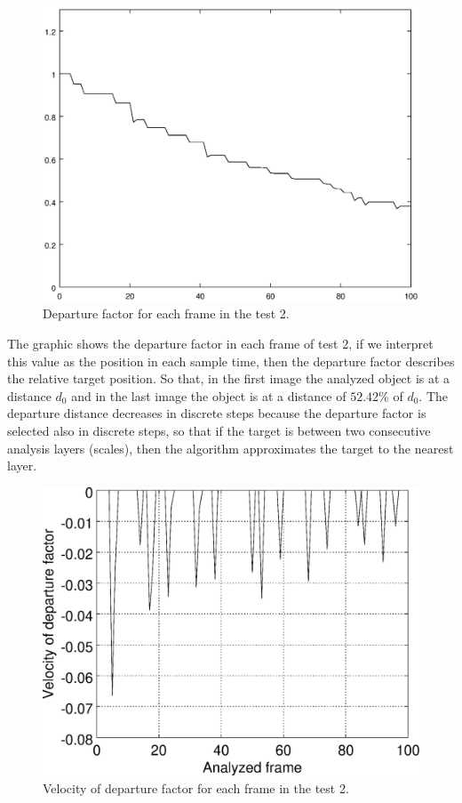 \begin{figure}[!hbt]
\includegraphics[width=\columnwidth]{images/graph2.eps}
\caption{Departure factor for each frame in the test 2.}
\label{fig:res_graph2}
\end{figure}
The graphic shows the departure factor in each frame
of test 2, if we interpret this value as the position in each sample time, 
then the departure factor describes the relative target position.
So that, in the first image the analyzed object is at a distance $d_0$ 
and in the last image the object is at a distance of $52.42\%$ of $d_0$.
The departure distance decreases in discrete steps because the departure
factor is selected also in discrete steps, so that if the target is
between two consecutive analysis layers (scales), then the algorithm
approximates the target to the nearest layer. 
\begin{figure}[!hbt]
\includegraphics[width=\columnwidth]{images/graph2v.eps}
\caption{Velocity of departure factor for each frame in the test 2.}
\label{fig:res_graph2v}
\end{figure}
